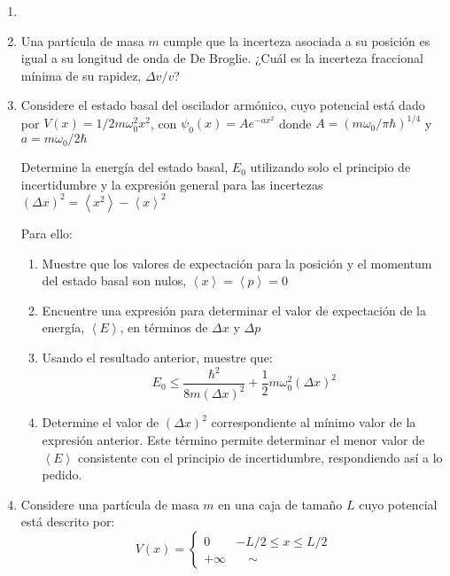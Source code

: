 \documentclass[letterpaper,11pt]{article}
\begin{document}
\vspace{-1cm}
\begin{enumerate}\setlength{\itemsep}{0.4cm}

\item[]

\item Una partícula de masa $m$ cumple que la incerteza asociada a su posición es igual a su longitud de onda de De Broglie. ¿Cuál es la incerteza fraccional mínima de su rapidez, $\Delta v/v$?

\item Considere el estado basal del oscilador armónico, cuyo potencial está dado por $V(x) = 1/2 m\omega_0^2 x^2$, con $\psi_0(x) = A e^{-ax^2}$ donde $A = (m\omega_0/\pi\hbar)^{1/4}$ y $a=m\omega_0/2\hbar$

Determine la energía del estado basal, $E_0$ utilizando solo el principio de incertidumbre y la expresión general para las incertezas $(\Delta x)^2 = \left<x^2\right> - \left<x\right>^2$

Para ello:
\begin{enumerate}
    \item Muestre que los valores de expectación para la posición y el momentum del estado basal son nulos, $\left<x\right> = \left<p\right> = 0$

    \item Encuentre una expresión para determinar el valor de expectación de la energía, $\left<E\right>$, en términos de $\Delta x$ y $\Delta p$

    \item Usando el resultado anterior, muestre que:
    $$E_0 \leq \frac{\hbar^2}{8m(\Delta x)^2} + \frac{1}{2}m\omega_0^2(\Delta x)^2$$

    \item Determine el valor de $(\Delta x)^2$ correspondiente al mínimo valor de la expresión anterior. Este término permite determinar el menor valor de $\left<E\right>$ consistente con el principio de incertidumbre, respondiendo así a lo pedido.
\end{enumerate}


\item Considere una partícula de masa $m$ en una caja de tamaño $L$ cuyo potencial está descrito por:
\[V(x) = 
    \begin{cases}
        0 & -L/2\leq x\leq L/2\\
        +\infty & \quad \sim
    \end{cases}
\]


\end{enumerate}
\end{document}
